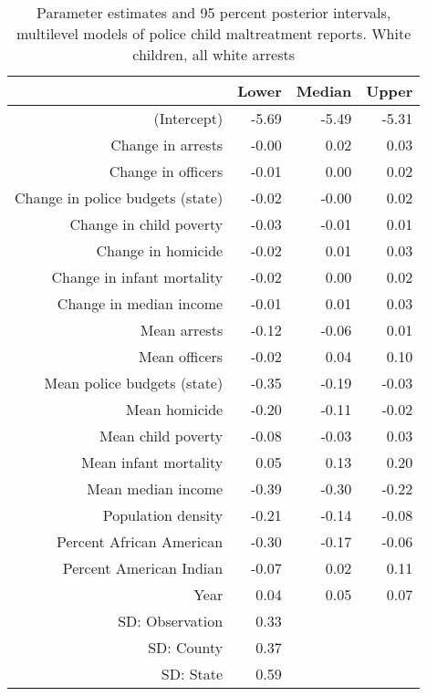 \begin{table}[ht]
\centering
\begin{tabular}{rrrr}
  \hline
 & Lower & Median & Upper \\ 
  \hline
(Intercept) & -5.69 & -5.49 & -5.31 \\ 
  Change in arrests & -0.00 & 0.02 & 0.03 \\ 
  Change in officers & -0.01 & 0.00 & 0.02 \\ 
  Change in police budgets (state) & -0.02 & -0.00 & 0.02 \\ 
  Change in child poverty & -0.03 & -0.01 & 0.01 \\ 
  Change in homicide & -0.02 & 0.01 & 0.03 \\ 
  Change in infant mortality & -0.02 & 0.00 & 0.02 \\ 
  Change in median income & -0.01 & 0.01 & 0.03 \\ 
  Mean arrests & -0.12 & -0.06 & 0.01 \\ 
  Mean officers & -0.02 & 0.04 & 0.10 \\ 
  Mean police budgets (state) & -0.35 & -0.19 & -0.03 \\ 
  Mean homicide & -0.20 & -0.11 & -0.02 \\ 
  Mean child poverty & -0.08 & -0.03 & 0.03 \\ 
  Mean infant mortality & 0.05 & 0.13 & 0.20 \\ 
  Mean median income & -0.39 & -0.30 & -0.22 \\ 
  Population density & -0.21 & -0.14 & -0.08 \\ 
  Percent African American & -0.30 & -0.17 & -0.06 \\ 
  Percent American Indian & -0.07 & 0.02 & 0.11 \\ 
  Year & 0.04 & 0.05 & 0.07 \\ 
  SD: Observation & 0.33 &  &  \\ 
  SD: County & 0.37 &  &  \\ 
  SD: State & 0.59 &  &  \\ 
   \hline
\end{tabular}
\caption{Parameter estimates and 95 percent posterior intervals, multilevel models of 
             police child maltreatment reports. White children, all white arrests} 
\end{table}
